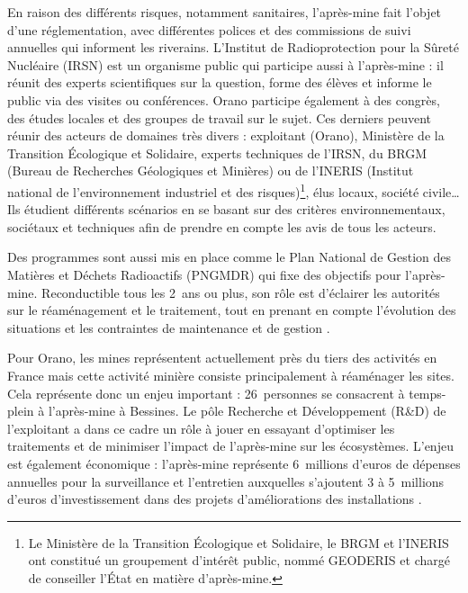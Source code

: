 \documentclass{article}
\begin{document}
En raison des différents risques, notamment sanitaires, l’après-mine fait l’objet d’une réglementation, avec différentes polices et des commissions de suivi annuelles qui informent les riverains.
L’Institut de Radioprotection pour la Sûreté Nucléaire (IRSN) est un organisme public qui participe aussi à l’après-mine : il réunit des experts scientifiques sur la question, forme des élèves et informe le public via des visites ou conférences. Orano participe également à des congrès, des études locales et des groupes de travail sur le sujet. Ces derniers peuvent réunir des acteurs de domaines très divers : exploitant (Orano), Ministère de la Transition Écologique et Solidaire, experts techniques de l’IRSN, du BRGM (Bureau de Recherches Géologiques et Minières) ou de l'INERIS (Institut national de l'environnement industriel et des risques)\footnote{Le Ministère de la Transition Écologique et Solidaire, le BRGM et l'INERIS ont constitué un groupement d'intérêt public, nommé GEODERIS et chargé de conseiller l'État en matière d'après-mine.}, élus locaux, société civile… Ils étudient différents scénarios en se basant sur des critères environnementaux, sociétaux et techniques afin de prendre en compte les avis de tous les acteurs.

Des programmes sont aussi mis en place comme le Plan National de Gestion des Matières et Déchets Radioactifs (PNGMDR) qui fixe des objectifs pour l’après-mine. Reconductible tous les 2~ans ou plus, son rôle est d’éclairer les autorités sur le réaménagement et le traitement, tout en prenant en compte l’évolution des situations et les contraintes de maintenance et de gestion \cite{dublineau_gestion_2020}.

Pour Orano, les mines représentent actuellement près du tiers des activités en France mais cette activité minière consiste principalement à réaménager les sites. Cela représente donc un enjeu important : 26~personnes se consacrent à temps-plein à l'après-mine à Bessines. Le pôle Recherche et Développement (R\&D) de l’exploitant a dans ce cadre un rôle à jouer en essayant d’optimiser les traitements et de minimiser l’impact de l’après-mine sur les écosystèmes. L'enjeu est également économique : l’après-mine représente 6~millions d’euros de dépenses annuelles pour la surveillance et l’entretien auxquelles s’ajoutent 3 à 5~millions d’euros d’investissement dans des projets d’améliorations des installations \cite{himeur_apres-mine_2020}.
\end{document}
